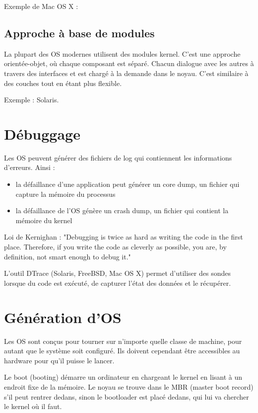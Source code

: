 	Exemple de Mac OS X :
	
	
	\subsection{Approche à base de modules}
	
	La plupart des OS modernes utilisent des modules kernel. C'est une approche orientée-objet, où chaque composant est séparé. Chacun dialogue avec les autres à travers des interfaces et est chargé à la demande dans le noyau. C'est similaire à des couches tout en étant plus flexible.
	
	Exemple : Solaris.
	
\section{Débuggage}

Les OS peuvent générer des fichiers de log qui contiennent les informations d'erreurs. Ainsi :

\begin{itemize}
	\item la défaillance d'une application peut générer un core dump, un fichier qui capture la mémoire du processus
	\item la défaillance de l'OS génère un crash dump, un fichier qui contient la mémoire du kernel
\end{itemize}

Loi de Kernighan : "Debugging is twice as hard as writing the code in the first place. Therefore, if you write the code as cleverly as possible, you are, by definition, not smart enough to debug it."

L'outil DTrace (Solaris, FreeBSD, Mac OS X) permet d'utiliser des sondes lorsque du code est exécuté, de capturer l'état des données et le récupérer.


\section{Génération d'OS}

Les OS sont conçus pour tourner sur n'importe quelle classe de machine, pour autant que le système soit configuré. Ils doivent cependant être accessibles au hardware pour qu'il puisse le lancer.

Le boot (booting) démarre un ordinateur en chargeant le kernel en lisant à un endroit fixe de la mémoire. Le noyau se trouve dans le MBR (master boot record) s'il peut rentrer dedans, sinon le bootloader est placé dedans, qui lui va chercher le kernel où il faut.


